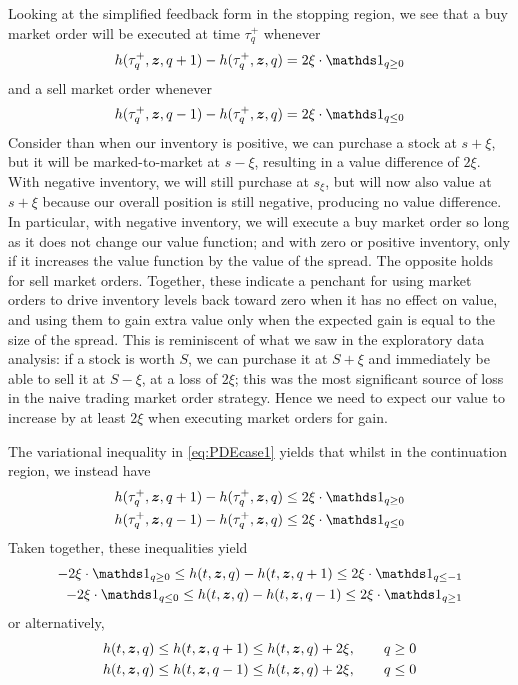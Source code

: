 Looking at the simplified feedback form in the stopping region, we see that a buy market order will be executed at time $\tau^+_q$ whenever
\begin{equation}\label{eq:buyMOfeedbackcase1}
h(\tau^+_q, \bz, q+1) - h(\tau^+_q,\bz,q) = 2 \xi \cdot \indicator_{q \geq 0}
\end{equation}
and a sell market order whenever
\begin{equation}\label{eq:sellMOfeedbackcase1}
h(\tau^+_q, \bz, q-1) - h(\tau^+_q,\bz,q) = 2 \xi \cdot \indicator_{q \leq 0}
\end{equation}
Consider than when our inventory is positive, we can purchase a stock at $s+\xi$, but it will be marked-to-market at $s-\xi$, resulting in a value difference of $2\xi$. With negative inventory, we will still purchase at $s_\xi$, but will now also value at $s+\xi$ because our overall position is still negative, producing no value difference. In particular, with negative inventory, we will execute a buy market order so long as it does not change our value function; and with zero or positive inventory, only if it increases the value function by the value of the spread. The opposite holds for sell market orders. Together, these indicate a penchant for using market orders to drive inventory levels back toward zero when it has no effect on value, and using them to gain extra value only when the expected gain is equal to the size of the spread. This is reminiscent of what we saw in the exploratory data analysis: if a stock is worth $S$, we can purchase it at $S+\xi$ and immediately be able to sell it at $S-\xi$, at a loss of $2 \xi$; this was the most significant source of loss in the naive trading market order strategy. Hence we need to expect our value to increase by at least $2\xi$ when executing market orders for gain.

The variational inequality in \eqref{eq:PDEcase1} yields that whilst in the continuation region, we instead have
\begin{align}
h(\tau^+_q, \bz, q+1) - h(\tau^+_q,\bz,q) & \leq 2 \xi \cdot \indicator_{q \geq 0} \\
h(\tau^+_q, \bz, q-1) - h(\tau^+_q,\bz,q) & \leq 2 \xi \cdot \indicator_{q \leq 0}
\end{align}
Taken together, these inequalities yield
\begin{align}
-2\xi \cdot \indicator_{q \geq 0} \leq h(t,\bz,q) - h(t,\bz,q+1) \leq 2\xi \cdot \indicator_{q \leq -1} \label{eq:MOineq1}\\
-2\xi \cdot \indicator_{q \leq 0} \leq h(t,\bz,q) - h(t,\bz,q-1) \leq 2\xi \cdot \indicator_{q \geq 1} \label{eq:MOineq2}
\end{align}
or alternatively,
\begin{align}
h(t,\bm{z},q) \leq h(t,\bm{z},q+1) \leq h(t,\bm{z},q) + 2\xi, \qquad q \geq 0 \\
h(t,\bm{z},q) \leq h(t,\bm{z},q-1) \leq h(t,\bm{z},q) + 2\xi, \qquad q \leq 0 
\end{align}

